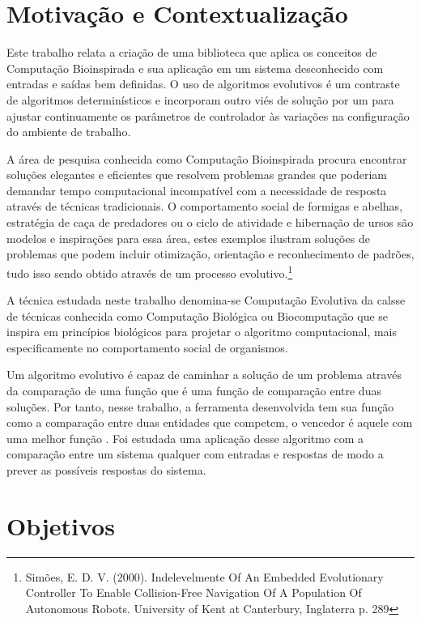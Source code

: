 \section{Motivação e Contextualização}

\newcommand\SE{\sigla{SE}{Sistema Evolutivo}\xspace}

Este trabalho relata a criação de uma biblioteca que aplica os conceitos de Computação Bioinspirada e sua aplicação em um sistema desconhecido com entradas e saídas bem definidas. O uso de algoritmos evolutivos é um contraste de algoritmos determinísticos  e incorporam outro viés de solução por um \SE\cite{Layzell1999} para ajustar continuamente os parâmetros de controlador às variações na configuração do ambiente de trabalho.

A área de pesquisa conhecida como Computação Bioinspirada procura encontrar soluções elegantes e eficientes que resolvem problemas grandes que poderiam demandar tempo computacional incompatível com a necessidade de resposta através de técnicas tradicionais. O comportamento social de formigas e abelhas, estratégia de caça de predadores ou o ciclo de atividade e hibernação de ursos são modelos e inspirações para essa área, estes exemplos ilustram soluções de problemas que podem incluir otimização, orientação e reconhecimento de padrões, tudo isso sendo obtido através de um processo evolutivo.\footnote{Simões, E. D. V. (2000). Indelevelmente Of An Embedded Evolutionary Controller To Enable Collision-Free Navigation Of A Population Of Autonomous Robots. University of Kent at Canterbury, Inglaterra p. 289}

A técnica estudada neste trabalho denomina-se Computação Evolutiva da calsse de técnicas conhecida como Computação Biológica ou Biocomputação que se inspira em princípios biológicos para projetar o algoritmo computacional, mais especificamente no comportamento social de organismos.

Um algoritmo evolutivo é capaz de caminhar a solução de um problema através da comparação de uma função \fitness que é uma função de comparação entre duas soluções. Por tanto, nesse trabalho, a ferramenta desenvolvida tem sua função \fitness como a comparação entre duas entidades que competem, o vencedor é aquele com uma melhor função \fitness. Foi estudada uma aplicação desse algoritmo com a comparação entre um sistema qualquer com entradas e respostas de modo a prever as possíveis respostas do sistema.

\section{Objetivos}

